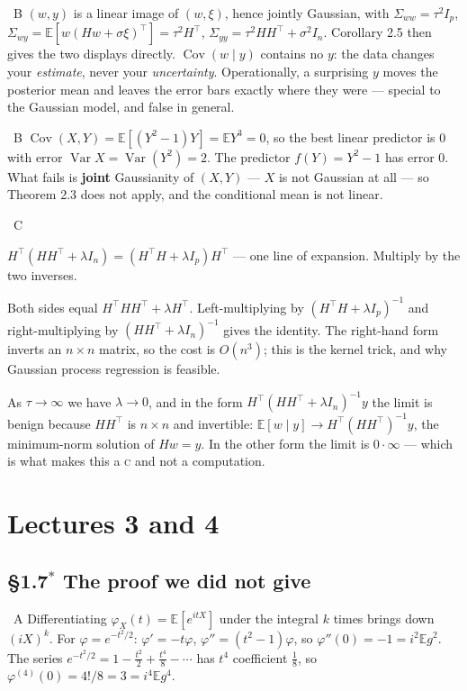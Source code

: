 \documentclass[10pt]{article}
\newcommand{\Q}[2]{\medskip\noindent{\color{acc}\textbf{#1}}\ {\scriptsize\color{grey}\textsc{#2}}\quad}
\newcommand{\E}{\mathbb{E}}
\newcommand{\Var}{\operatorname{Var}}
\newcommand{\Cov}{\operatorname{Cov}}
\newcommand{\T}{^{\!\top}}
\begin{document}
\Q{2.11}{B} $(w,y)$ is a linear image of $(w,\xi)$, hence jointly Gaussian, with
$\Sigma_{ww}=\tau^2I_p$, $\Sigma_{wy}=\E[w(Hw+\sigma\xi)\T]=\tau^2H\T$, $\Sigma_{yy}=\tau^2HH\T+\sigma^2I_n$.
Corollary 2.5 then gives the two displays directly. $\Cov(w\mid y)$ contains no $y$: the data changes your \emph{estimate}, never your \emph{uncertainty}. Operationally, a surprising $y$ moves the posterior mean and leaves the error bars exactly where they were --- special to the Gaussian model, and false in general.

\Q{2.12}{B} $\Cov(X,Y)=\E[(Y^2-1)Y]=\E Y^3=0$, so the best linear predictor is $0$ with error $\Var X=\Var(Y^2)=2$. The predictor $f(Y)=Y^2-1$ has error $0$. What fails is \textbf{joint} Gaussianity of $(X,Y)$ --- $X$ is not Gaussian at all --- so Theorem 2.3 does not apply, and the conditional mean is not linear.

\Q{2.13}{C}
\begin{idea}
$H\T(HH\T+\lambda I_n)=(H\T H+\lambda I_p)H\T$ --- one line of expansion. Multiply by the two inverses.
\end{idea}
Both sides equal $H\T HH\T+\lambda H\T$. Left-multiplying by $(H\T H+\lambda I_p)^{-1}$ and right-multiplying by $(HH\T+\lambda I_n)^{-1}$ gives the identity. The right-hand form inverts an $n\times n$ matrix, so the cost is $O(n^3)$; this is the kernel trick, and why Gaussian process regression is feasible.

As $\tau\to\infty$ we have $\lambda\to0$, and in the form $H\T(HH\T+\lambda I_n)^{-1}y$ the limit is benign because $HH\T$ is $n\times n$ and invertible: $\E[w\mid y]\to H\T(HH\T)^{-1}y$, the minimum-norm solution of $Hw=y$. In the other form the limit is $0\cdot\infty$ --- which is what makes this a \textsc{c} and not a computation.

\section{Lectures 3 and 4}
\subsection{\S1.7$^\ast$ The proof we did not give}

\Q{1.9}{A} Differentiating $\varphi_X(t)=\E[e^{itX}]$ under the integral $k$ times brings down $(iX)^k$. For $\varphi=e^{-t^2/2}$: $\varphi'=-t\varphi$, $\varphi''=(t^2-1)\varphi$, so $\varphi''(0)=-1=i^2\E g^2$. The series $e^{-t^2/2}=1-\tfrac{t^2}{2}+\tfrac{t^4}{8}-\cdots$ has $t^4$ coefficient $\tfrac18$, so $\varphi^{(4)}(0)=4!/8=3=i^4\E g^4$.
\end{document}
